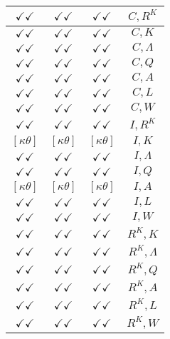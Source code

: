 \documentclass[a4paper,10pt]{article}
\begin{document}
\begin{longtable}{|c|c|c|c|}
\hline
$\checkmark\checkmark$ & $\checkmark\checkmark$ & $\checkmark\checkmark$ & ${C},{R^{K}}$ \\
\hline
$\checkmark\checkmark$ & $\checkmark\checkmark$ & $\checkmark\checkmark$ & ${C},{K}$ \\
\hline
$\checkmark\checkmark$ & $\checkmark\checkmark$ & $\checkmark\checkmark$ & ${C},{\Lambda}$ \\
\hline
$\checkmark\checkmark$ & $\checkmark\checkmark$ & $\checkmark\checkmark$ & ${C},{Q}$ \\
\hline
$\checkmark\checkmark$ & $\checkmark\checkmark$ & $\checkmark\checkmark$ & ${C},{A}$ \\
\hline
$\checkmark\checkmark$ & $\checkmark\checkmark$ & $\checkmark\checkmark$ & ${C},{L}$ \\
\hline
$\checkmark\checkmark$ & $\checkmark\checkmark$ & $\checkmark\checkmark$ & ${C},{W}$ \\
\hline
$\checkmark\checkmark$ & $\checkmark\checkmark$ & $\checkmark\checkmark$ & ${I},{R^{K}}$ \\
\hline
$[\kappa \theta ]$ & $[\kappa \theta ]$ & $[\kappa \theta ]$ & ${I},{K}$ \\
\hline
$\checkmark\checkmark$ & $\checkmark\checkmark$ & $\checkmark\checkmark$ & ${I},{\Lambda}$ \\
\hline
$\checkmark\checkmark$ & $\checkmark\checkmark$ & $\checkmark\checkmark$ & ${I},{Q}$ \\
\hline
$[\kappa \theta ]$ & $[\kappa \theta ]$ & $[\kappa \theta ]$ & ${I},{A}$ \\
\hline
$\checkmark\checkmark$ & $\checkmark\checkmark$ & $\checkmark\checkmark$ & ${I},{L}$ \\
\hline
$\checkmark\checkmark$ & $\checkmark\checkmark$ & $\checkmark\checkmark$ & ${I},{W}$ \\
\hline
$\checkmark\checkmark$ & $\checkmark\checkmark$ & $\checkmark\checkmark$ & ${R^{K}},{K}$ \\
\hline
$\checkmark\checkmark$ & $\checkmark\checkmark$ & $\checkmark\checkmark$ & ${R^{K}},{\Lambda}$ \\
\hline
$\checkmark\checkmark$ & $\checkmark\checkmark$ & $\checkmark\checkmark$ & ${R^{K}},{Q}$ \\
\hline
$\checkmark\checkmark$ & $\checkmark\checkmark$ & $\checkmark\checkmark$ & ${R^{K}},{A}$ \\
\hline
$\checkmark\checkmark$ & $\checkmark\checkmark$ & $\checkmark\checkmark$ & ${R^{K}},{L}$ \\
\hline
$\checkmark\checkmark$ & $\checkmark\checkmark$ & $\checkmark\checkmark$ & ${R^{K}},{W}$ \\

\end{longtable}
\end{document}
